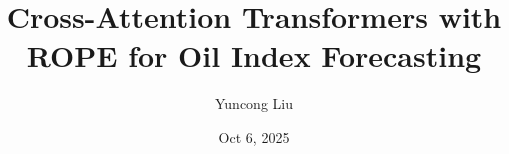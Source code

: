 \title[Ropeformer: Cross-Attention]{Cross-Attention Transformers with ROPE for Oil Index Forecasting}

\author[Y. Liu]{Yuncong Liu}


\date{Oct 6, 2025}

\titlegraphic{}
